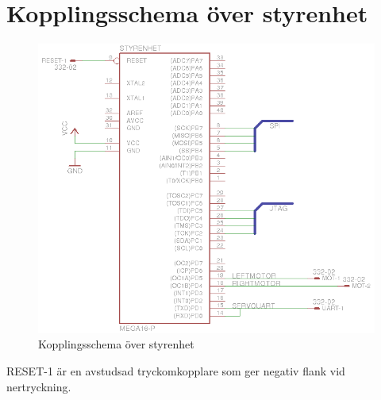 \section{Kopplingsschema över styrenhet}

\begin{figure}[h]
\center
\includegraphics{styrenhet}
\caption{Kopplingsschema över styrenhet}
\end{figure}

RESET-1 är en avstudsad tryckomkopplare som ger negativ flank vid nertryckning.
